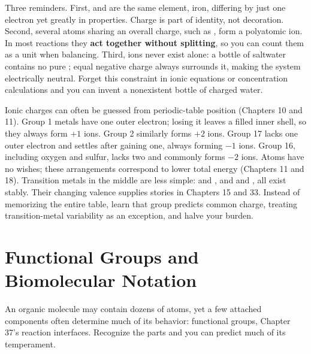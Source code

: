 Three reminders. First,  and  are the same element, iron, differing by just one electron yet greatly in properties. Charge is part of identity, not decoration. Second, several atoms sharing an overall charge, such as , form a polyatomic ion. In most reactions they \textbf{act together without splitting}, so you can count them as a unit when balancing. Third, ions never exist alone: a bottle of saltwater contains no pure ; equal negative charge always surrounds it, making the system electrically neutral. Forget this constraint in ionic equations or concentration calculations and you can invent a nonexistent bottle of charged water.

Ionic charges can often be guessed from periodic-table position (Chapters 10 and 11). Group 1 metals have one outer electron; losing it leaves a filled inner shell, so they always form $+1$ ions. Group 2 similarly forms $+2$ ions. Group 17 lacks one outer electron and settles after gaining one, always forming $-1$ ions. Group 16, including oxygen and sulfur, lacks two and commonly forms $-2$ ions. Atoms have no wishes; these arrangements correspond to lower total energy (Chapters 11 and 18). Transition metals in the middle are less simple:  and , and  and , all exist stably. Their changing valence supplies stories in Chapters 15 and 33. Instead of memorizing the entire table, learn that group predicts common charge, treating transition-metal variability as an exception, and halve your burden.

\section{Functional Groups and Biomolecular Notation}

An organic molecule may contain dozens of atoms, yet a few attached components often determine much of its behavior: functional groups, Chapter 37's reaction interfaces. Recognize the parts and you can predict much of its temperament.

